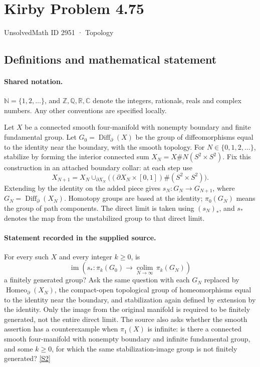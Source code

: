 \documentclass[11pt]{article}
\newcommand{\sref}[2]{\hyperlink{source:#1:#2}{[S#2]}}
\begin{document}
\setcounter{section}{2950}
\section{Kirby Problem 4.75}\label{2951}
{\small\sffamily UnsolvedMath ID 2951 · Topology}
\subsection{Definitions and mathematical statement}

\paragraph{Shared notation.}$\mathbb N=\{1,2,\ldots\}$, and $\mathbb Z,\mathbb Q,\mathbb R,\mathbb C$ denote the integers, rationals, reals and complex numbers. Any other conventions are specified locally.


Let $X$ be a connected smooth four-manifold with nonempty boundary and finite fundamental group. Let $G_0=\operatorname{Diff}_{\partial}(X)$ be the group of diffeomorphisms equal to the identity near the boundary, with the smooth topology. For $N\in\{0,1,2,\ldots\}$, stabilize by forming the interior connected sum $X_N=X\#N(S^2\times S^2)$. Fix this construction in an attached boundary collar: at each step use
\[
X_{N+1}=X_N\cup_{\partial X_N}\bigl((\partial X_N\times[0,1])\#(S^2\times S^2)\bigr).
\]
Extending by the identity on the added piece gives $s_N:G_N\to G_{N+1}$, where $G_N=\operatorname{Diff}_{\partial}(X_N)$. Homotopy groups are based at the identity; $\pi_0(G_N)$ means the group of path components. The direct limit is taken using $(s_N)_*$, and $s_*$ denotes the map from the unstabilized group to that direct limit.
\paragraph{Statement recorded in the supplied source.}
For every such $X$ and every integer $k\ge0$, is
\[
\operatorname{im}\left(s_*:\pi_k(G_0)\longrightarrow\underset{N\to\infty}{\operatorname{colim}}\,\pi_k(G_N)\right)
\]
a finitely generated group? Ask the same question with each $G_N$ replaced by $\operatorname{Homeo}_{\partial}(X_N)$, the compact-open topological group of homeomorphisms equal to the identity near the boundary, and stabilization again defined by extension by the identity. Only the image from the original manifold is required to be finitely generated, not the entire direct limit. The source also asks whether the smooth assertion has a counterexample when $\pi_1(X)$ is infinite: is there a connected smooth four-manifold with nonempty boundary and infinite fundamental group, and some $k\ge0$, for which the same stabilization-image group is not finitely generated? \sref{2951}{2}
\end{document}
